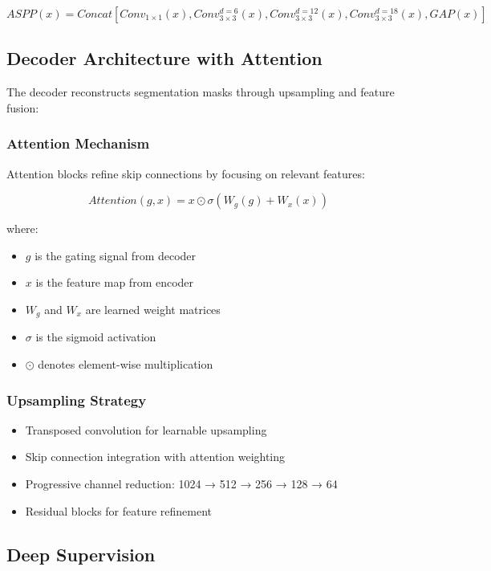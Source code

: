 \begin{equation}
ASPP(x) = Concat[Conv_{1×1}(x), Conv_{3×3}^{d=6}(x), Conv_{3×3}^{d=12}(x), Conv_{3×3}^{d=18}(x), GAP(x)]
\end{equation}

\subsection{Decoder Architecture with Attention}

The decoder reconstructs segmentation masks through upsampling and feature fusion:

\subsubsection{Attention Mechanism}
Attention blocks refine skip connections by focusing on relevant features:

\begin{equation}
Attention(g, x) = x \odot \sigma(W_g(g) + W_x(x))
\end{equation}

where:
\begin{itemize}
\item $g$ is the gating signal from decoder
\item $x$ is the feature map from encoder
\item $W_g$ and $W_x$ are learned weight matrices
\item $\sigma$ is the sigmoid activation
\item $\odot$ denotes element-wise multiplication
\end{itemize}

\subsubsection{Upsampling Strategy}
\begin{itemize}
\item Transposed convolution for learnable upsampling
\item Skip connection integration with attention weighting
\item Progressive channel reduction: 1024 → 512 → 256 → 128 → 64
\item Residual blocks for feature refinement
\end{itemize}

\subsection{Deep Supervision}

